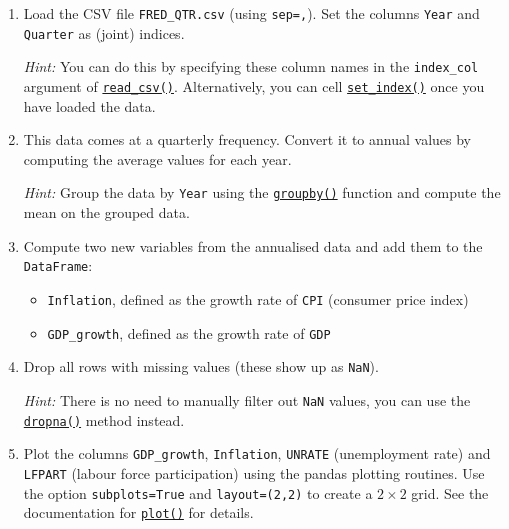 \documentclass{scrartcl}
\providecommand{\tightlist}{%
      \setlength{\itemsep}{0pt}\setlength{\parskip}{0pt}}
\begin{document}
\begin{enumerate}
\def\labelenumi{\arabic{enumi}.}
\item
  Load the CSV file \texttt{FRED\_QTR.csv} (using
  \texttt{sep=\textquotesingle{},\textquotesingle{}}). Set the columns
  \texttt{Year} and \texttt{Quarter} as (joint) indices.

  \emph{Hint:} You can do this by specifying these column names in the
  \texttt{index\_col} argument of
  \href{https://pandas.pydata.org/pandas-docs/stable/reference/api/pandas.read_csv.html}{\texttt{read\_csv()}}.
  Alternatively, you can cell
  \href{https://pandas.pydata.org/pandas-docs/stable/reference/api/pandas.DataFrame.set_index.html}{\texttt{set\_index()}}
  once you have loaded the data.
\item
  This data comes at a quarterly frequency. Convert it to annual values
  by computing the average values for each year.

  \emph{Hint:} Group the data by \texttt{Year} using the
  \href{https://pandas.pydata.org/pandas-docs/stable/reference/api/pandas.DataFrame.groupby.html}{\texttt{groupby()}}
  function and compute the mean on the grouped data.
\item
  Compute two new variables from the annualised data and add them to the
  \texttt{DataFrame}:

  \begin{itemize}
  \tightlist
  \item
    \texttt{Inflation}, defined as the growth rate of \texttt{CPI}
    (consumer price index)
  \item
    \texttt{GDP\_growth}, defined as the growth rate of \texttt{GDP}
  \end{itemize}
\item
  Drop all rows with missing values (these show up as \texttt{NaN}).

  \emph{Hint:} There is no need to manually filter out \texttt{NaN}
  values, you can use the
  \href{https://pandas.pydata.org/pandas-docs/stable/reference/api/pandas.DataFrame.dropna.html}{\texttt{dropna()}}
  method instead.
\item
  Plot the columns \texttt{GDP\_growth}, \texttt{Inflation},
  \texttt{UNRATE} (unemployment rate) and \texttt{LFPART} (labour force
  participation) using the pandas plotting routines. Use the option
  \texttt{subplots=True} and \texttt{layout=(2,2)} to create a
  \(2\times2\) grid. See the documentation for
  \href{https://pandas.pydata.org/docs/reference/api/pandas.DataFrame.plot.html\#pandas.DataFrame.plot}{\texttt{plot()}}
  for details.
\end{enumerate}
\end{document}
